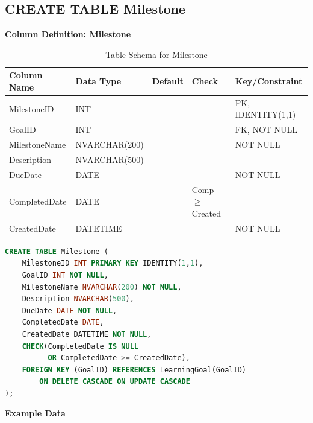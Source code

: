 \documentclass[12pt,a4paper]{report}
\begin{document}
\vspace{5cm}

% 
\subsection{CREATE TABLE Milestone}

\textbf{Column Definition: Milestone}
\begin{table}[ht]
\centering
\small
\begin{tabular}{|l|l|l|l|l|}
\hline
\textbf{Column Name} & \textbf{Data Type} & \textbf{Default} & \textbf{Check} & \textbf{Key/Constraint} \\ \hline
MilestoneID & INT & & & PK, IDENTITY(1,1) \\ \hline
GoalID & INT & & & FK, NOT NULL \\ \hline
MilestoneName & NVARCHAR(200) & & & NOT NULL \\ \hline
Description & NVARCHAR(500) & & & \\ \hline
DueDate & DATE & & & NOT NULL \\ \hline
CompletedDate & DATE & & Comp $\geq$ Created & \\ \hline
CreatedDate & DATETIME & & & NOT NULL \\ \hline
\end{tabular}
\caption{Table Schema for Milestone}
\label{tab:milestone_schema}
\end{table}

\vspace{0.3cm}

\begin{lstlisting}[language=SQL, caption=Create Table Milestone]
CREATE TABLE Milestone (
    MilestoneID INT PRIMARY KEY IDENTITY(1,1),
    GoalID INT NOT NULL,
    MilestoneName NVARCHAR(200) NOT NULL,
    Description NVARCHAR(500),
    DueDate DATE NOT NULL,
    CompletedDate DATE,
    CreatedDate DATETIME NOT NULL,
    CHECK(CompletedDate IS NULL 
          OR CompletedDate >= CreatedDate),
    FOREIGN KEY (GoalID) REFERENCES LearningGoal(GoalID) 
        ON DELETE CASCADE ON UPDATE CASCADE
);
\end{lstlisting}

\textbf{Example Data}
\end{document}

